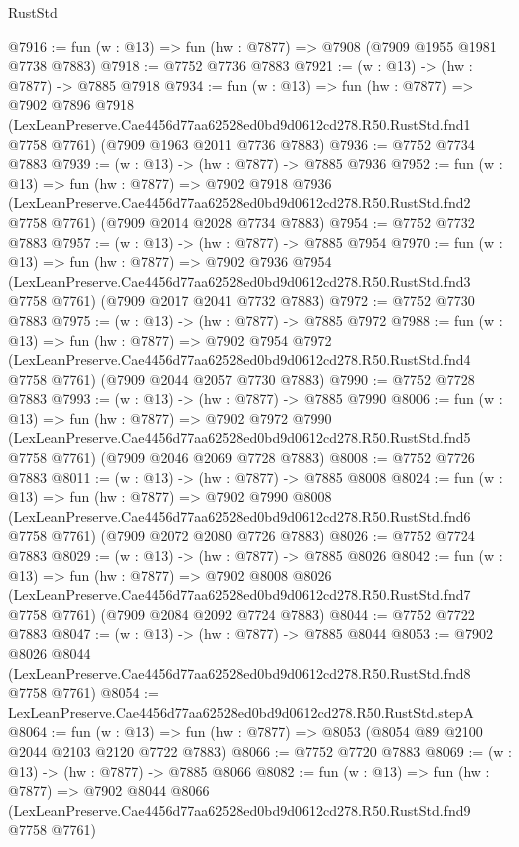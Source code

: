 \begin{lexlean}{RustStd}
\begin{coremodule}
@7916 := fun (w : @13) => fun (hw : @7877) => @7908 (@7909 @1955 @1981 @7738 @7883)
@7918 := @7752 @7736 @7883
@7921 := (w : @13) -> (hw : @7877) -> @7885 @7918
@7934 := fun (w : @13) =>
  fun (hw : @7877) =>
  @7902
    @7896
    @7918
    (LexLeanPreserve.Cae4456d77aa62528ed0bd9d0612cd278.R50.RustStd.fnd1 @7758 @7761)
    (@7909 @1963 @2011 @7736 @7883)
@7936 := @7752 @7734 @7883
@7939 := (w : @13) -> (hw : @7877) -> @7885 @7936
@7952 := fun (w : @13) =>
  fun (hw : @7877) =>
  @7902
    @7918
    @7936
    (LexLeanPreserve.Cae4456d77aa62528ed0bd9d0612cd278.R50.RustStd.fnd2 @7758 @7761)
    (@7909 @2014 @2028 @7734 @7883)
@7954 := @7752 @7732 @7883
@7957 := (w : @13) -> (hw : @7877) -> @7885 @7954
@7970 := fun (w : @13) =>
  fun (hw : @7877) =>
  @7902
    @7936
    @7954
    (LexLeanPreserve.Cae4456d77aa62528ed0bd9d0612cd278.R50.RustStd.fnd3 @7758 @7761)
    (@7909 @2017 @2041 @7732 @7883)
@7972 := @7752 @7730 @7883
@7975 := (w : @13) -> (hw : @7877) -> @7885 @7972
@7988 := fun (w : @13) =>
  fun (hw : @7877) =>
  @7902
    @7954
    @7972
    (LexLeanPreserve.Cae4456d77aa62528ed0bd9d0612cd278.R50.RustStd.fnd4 @7758 @7761)
    (@7909 @2044 @2057 @7730 @7883)
@7990 := @7752 @7728 @7883
@7993 := (w : @13) -> (hw : @7877) -> @7885 @7990
@8006 := fun (w : @13) =>
  fun (hw : @7877) =>
  @7902
    @7972
    @7990
    (LexLeanPreserve.Cae4456d77aa62528ed0bd9d0612cd278.R50.RustStd.fnd5 @7758 @7761)
    (@7909 @2046 @2069 @7728 @7883)
@8008 := @7752 @7726 @7883
@8011 := (w : @13) -> (hw : @7877) -> @7885 @8008
@8024 := fun (w : @13) =>
  fun (hw : @7877) =>
  @7902
    @7990
    @8008
    (LexLeanPreserve.Cae4456d77aa62528ed0bd9d0612cd278.R50.RustStd.fnd6 @7758 @7761)
    (@7909 @2072 @2080 @7726 @7883)
@8026 := @7752 @7724 @7883
@8029 := (w : @13) -> (hw : @7877) -> @7885 @8026
@8042 := fun (w : @13) =>
  fun (hw : @7877) =>
  @7902
    @8008
    @8026
    (LexLeanPreserve.Cae4456d77aa62528ed0bd9d0612cd278.R50.RustStd.fnd7 @7758 @7761)
    (@7909 @2084 @2092 @7724 @7883)
@8044 := @7752 @7722 @7883
@8047 := (w : @13) -> (hw : @7877) -> @7885 @8044
@8053 := @7902
    @8026
    @8044
    (LexLeanPreserve.Cae4456d77aa62528ed0bd9d0612cd278.R50.RustStd.fnd8 @7758 @7761)
@8054 := LexLeanPreserve.Cae4456d77aa62528ed0bd9d0612cd278.R50.RustStd.stepA
@8064 := fun (w : @13) => fun (hw : @7877) => @8053 (@8054 @89 @2100 @2044 @2103 @2120 @7722 @7883)
@8066 := @7752 @7720 @7883
@8069 := (w : @13) -> (hw : @7877) -> @7885 @8066
@8082 := fun (w : @13) =>
  fun (hw : @7877) =>
  @7902
    @8044
    @8066
    (LexLeanPreserve.Cae4456d77aa62528ed0bd9d0612cd278.R50.RustStd.fnd9 @7758 @7761)

\end{coremodule}
\end{lexlean}
